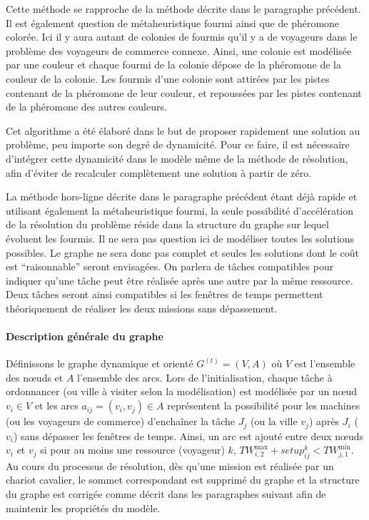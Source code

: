 Cette méthode se rapproche de la méthode décrite dans le paragraphe précédent. Il est également question de métaheuristique fourmi ainsi que de phéromone colorée. Ici il y aura autant de colonies de fourmis qu'il y a de voyageurs dans le problème des voyageurs de commerce connexe. Ainsi, une colonie est modélisée par une couleur et chaque fourmi de la colonie dépose de la phéromone de la couleur de la colonie. Les fourmis d'une colonie sont attirées par les pistes contenant de la phéromone de leur couleur, et repoussées par les pistes contenant de la phéromone des autres couleurs. 

Cet algorithme a été élaboré dans le but de proposer rapidement une solution au problème, peu importe son degré de dynamicité. Pour ce faire, il est nécessaire d'intégrer cette dynamicité dans le modèle même de la méthode de résolution, afin d'éviter de recalculer complètement une solution à partir de zéro.

La méthode hors-ligne décrite dans le paragraphe précédent étant déjà rapide et utilisant également la métaheuristique fourmi, la seule possibilité d'accélération de la résolution du problème réside dans la structure du graphe sur lequel évoluent les fourmis. 
Il ne sera pas question ici de modéliser toutes les solutions possibles. Le graphe ne sera donc pas complet et seules les solutions dont le coût est ``raisonnable'' seront envisagées. On parlera de tâches compatibles pour indiquer qu'une tâche peut être réalisée après une autre par la même ressource. Deux tâches seront ainsi compatibles si les fenêtres de temps permettent théoriquement de réaliser les deux missions sans dépassement. %

\paragraph{Description générale du graphe}

Définissons le graphe dynamique et orienté $G^{(t)}=(V,A)$ où $V$ est l'ensemble des n\oe{}uds et $A$ l'ensemble des arcs. Lors de l'initialisation, chaque tâche à ordonnancer (ou ville à visiter selon la modélisation) est modélisée par un n\oe{}ud $v_i \in V$ et les arcs $a_{ij} = (v_i,v_j) \in A$ représentent la possibilité pour les machines (ou les voyageurs de commerce) d'enchaîner la tâche $J_j$ (ou la ville $v_j$) après $J_i$ ($v_i$) sans dépasser les fenêtres de temps. Ainsi, un arc est ajouté entre deux n\oe{}uds $v_i$ et $v_j$ si pour au moins une ressource (voyageur) $k$, $TW_{i,2}^{\max} + setup^{k}_{ij} < TW_{j,1}^{\min}$. Au cours du processus de résolution, dès qu'une mission est réalisée par un chariot cavalier, le sommet correspondant est supprimé du graphe et la structure du graphe est corrigée comme décrit dans les paragraphes suivant afin de maintenir les propriétés du modèle.

